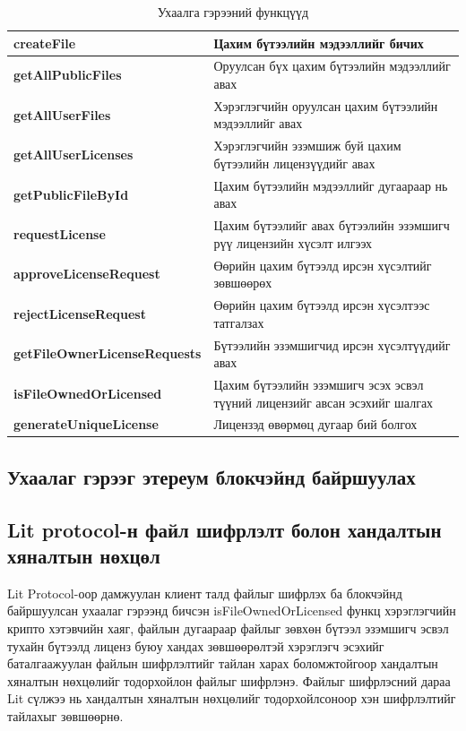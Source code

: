 \begin{table}[h!]
	\centering
   \begin{tabularx}{\textwidth}{|p{}|X|}
		\hline
		 \textbf{createFile}& Цахим бүтээлийн мэдээллийг бичих
	\\ \hline \textbf{getAllPublicFiles} & Оруулсан бүх цахим бүтээлийн мэдээллийг авах
	\\ \hline \textbf{getAllUserFiles} &  Хэрэглэгчийн оруулсан цахим бүтээлийн мэдээллийг авах
	\\ \hline \textbf{getAllUserLicenses} & Хэрэглэгчийн эзэмшиж буй цахим бүтээлийн лицензүүдийг авах
	\\ \hline \textbf{getPublicFileById} & Цахим бүтээлийн мэдээллийг дугаараар нь авах
	\\ \hline \textbf{requestLicense} & Цахим бүтээлийг авах бүтээлийн эзэмшигч рүү лицензийн хүсэлт илгээх
	\\ \hline \textbf{approveLicenseRequest} & Өөрийн цахим бүтээлд ирсэн хүсэлтийг зөвшөөрөх
	\\ \hline \textbf{rejectLicenseRequest} & Өөрийн цахим бүтээлд ирсэн хүсэлтээс татгалзах
	\\ \hline \textbf{getFileOwnerLicenseRequests} & Бүтээлийн эзэмшигчид ирсэн хүсэлтүүдийг авах
	\\ \hline \textbf{isFileOwnedOrLicensed} & Цахим бүтээлийн эзэмшигч эсэх эсвэл түүний лицензийг авсан эсэхийг шалгах
	\\ \hline \textbf{generateUniqueLicense} & Лицензэд өвөрмөц дугаар бий болгох                                                             \\ \hline
	\end{tabularx}
   \caption{Ухаалга гэрээний функцүүд}
\end{table}

\newpage
\subsection{Ухаалаг гэрээг этереум блокчэйнд байршуулах}


\subsection{Lit protocol-н файл шифрлэлт болон хандалтын хяналтын нөхцөл}
Lit Protocol-оор дамжуулан клиент талд файлыг шифрлэх ба блокчэйнд байршуулсан ухаалаг гэрээнд бичсэн isFileOwnedOrLicensed функц хэрэглэгчийн крипто хэтэвчийн хаяг, файлын дугаараар файлыг зөвхөн бүтээл эзэмшигч эсвэл тухайн бүтээлд лиценз буюу хандах зөвшөөрөлтэй хэрэглэгч эсэхийг баталгаажуулан файлын шифрлэлтийг тайлан харах боломжтойгоор хандалтын хяналтын нөхцөлийг тодорхойлон файлыг шифрлэнэ. Файлыг шифрлэсний дараа Lit сүлжээ нь хандалтын хяналтын нөхцөлийг тодорхойлсоноор хэн шифрлэлтийг тайлахыг зөвшөөрнө.

